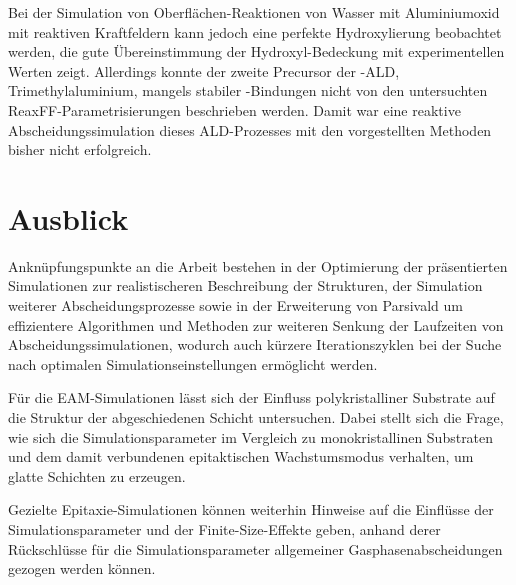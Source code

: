Bei der Simulation von Oberflächen-Reaktionen von Wasser mit Aluminiumoxid mit reaktiven Kraftfeldern kann jedoch eine perfekte Hydroxylierung beobachtet werden, die gute Übereinstimmung der Hydroxyl-Bedeckung mit experimentellen Werten zeigt.
Allerdings konnte der zweite Precursor der -ALD, Trimethylaluminium, mangels stabiler -Bindungen nicht von den untersuchten ReaxFF-Parametrisierungen beschrieben werden.
Damit war eine reaktive Abscheidungssimulation dieses ALD-Prozesses mit den vorgestellten Methoden bisher nicht erfolgreich.

\section{Ausblick}
Anknüpfungspunkte an die Arbeit bestehen in der Optimierung der präsentierten Simulationen zur realistischeren Beschreibung der Strukturen, der Simulation weiterer Abscheidungsprozesse sowie in der Erweiterung von Parsivald um effizientere Algorithmen und Methoden zur weiteren Senkung der Laufzeiten von Abscheidungssimulationen, wodurch auch kürzere Iterationszyklen bei der Suche nach optimalen Simulationseinstellungen ermöglicht werden.

Für die EAM-Simulationen lässt sich der Einfluss polykristalliner Substrate auf die Struktur der abgeschiedenen Schicht untersuchen.
Dabei stellt sich die Frage, wie sich die Simulationsparameter im Vergleich zu monokristallinen Substraten und dem damit verbundenen epitaktischen Wachstumsmodus verhalten, um glatte Schichten zu erzeugen.

Gezielte Epitaxie-Simulationen können weiterhin Hinweise auf die Einflüsse der Simulationsparameter und der Finite-Size-Effekte geben, anhand derer Rückschlüsse für die Simulationsparameter allgemeiner Gasphasenabscheidungen gezogen werden können.


